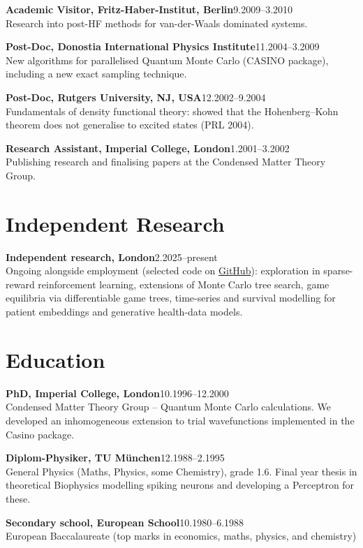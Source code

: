 \documentclass[11pt,a4paper]{article}
\newcommand{\entry}[3]{%
    \noindent\textbf{#1}\hfill #2\\
    #3\par\vspace{6pt}%
}
\begin{document}
\entry{Academic Visitor, Fritz-Haber-Institut, Berlin}{9.2009--3.2010}{%
Research into post-HF methods for van-der-Waals dominated systems.}

\entry{Post-Doc, Donostia International Physics Institute}{11.2004--3.2009}{%
New algorithms for parallelised Quantum Monte Carlo (CASINO package), including a new exact sampling technique.}

\entry{Post-Doc, Rutgers University, NJ, USA}{12.2002--9.2004}{%
Fundamentals of density functional theory: showed that the Hohenberg--Kohn theorem does not generalise to excited states (PRL 2004).}

\entry{Research Assistant, Imperial College, London}{1.2001--3.2002}{%
Publishing research and finalising papers at the Condensed Matter Theory Group.}

\section*{Independent Research}

\entry{Independent research, London}{2.2025--present}{%
Ongoing alongside employment (selected code on \href{https://github.com/RGaudoin}{GitHub}): exploration in sparse-reward reinforcement learning, extensions of Monte Carlo tree search, game equilibria via differentiable game trees, time-series and survival modelling for patient embeddings and generative health-data models.}

\section*{Education}

\entry{PhD, Imperial College, London}{10.1996--12.2000}{%
Condensed Matter Theory Group -- Quantum Monte Carlo calculations. We developed an inhomogeneous extension to trial wavefunctions implemented in the Casino package.}

\entry{Diplom-Physiker, TU München}{12.1988--2.1995}{%
General Physics (Maths, Physics, some Chemistry), grade 1.6. Final year thesis in theoretical Biophysics modelling spiking neurons and developing a Perceptron for these.}

\entry{Secondary school, European School}{10.1980--6.1988}{%
European Baccalaureate (top marks in economics, maths, physics, and chemistry)}
\end{document}
